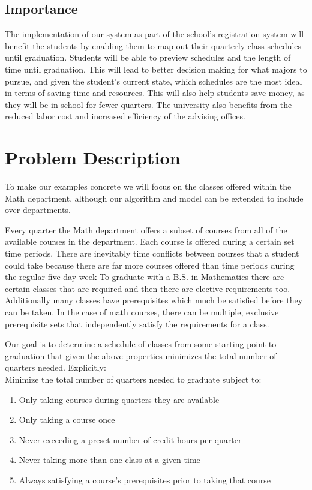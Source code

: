 \documentclass[11pt]{article} %
\begin{document}
\subsection{Importance} The implementation of our system as part of the school’s
registration system will benefit the students by enabling them to map out their
quarterly class schedules until graduation. Students will be able to preview
schedules and the length of time until graduation.  This will lead to better
decision making for what majors to pursue, and given the student's current
state, which schedules are the most ideal in terms of saving time and resources.
This will also help students save money, as they will be in school for fewer
quarters. The university also benefits from the reduced labor cost and increased
efficiency of the advising offices.

\section{Problem Description} \label{pdesc} To make our examples concrete we
will focus on the classes offered within the Math department, although our
algorithm and model can be extended to include over departments. 

Every quarter the Math department offers a subset of courses from all of the
available courses in the department. Each course is offered during a certain set
time periods. There are inevitably time conflicts between courses that a student
could take because there are far more courses offered than time periods during
the regular five-day week  To graduate with a B.S. in Mathematics there are
certain classes that are required and then there are elective requirements too.
Additionally many classes have prerequisites which much be satisfied before they
can be taken. In the case of math courses, there can be multiple, exclusive
prerequisite sets that independently satisfy the requirements for a class.

Our goal is to determine a schedule of classes from some starting point to
graduation that given the above properties minimizes the total number of
quarters needed. Explicitly: \\ Minimize the total
number of quarters needed to graduate subject to: \begin{enumerate} \item Only
taking courses during quarters they are available \item Only taking a course
once \item Never exceeding a preset number of credit hours per quarter \item
Never taking more than one class at a given time \item Always satisfying
a course's prerequisites prior to taking that course \end{enumerate}
\end{document}
